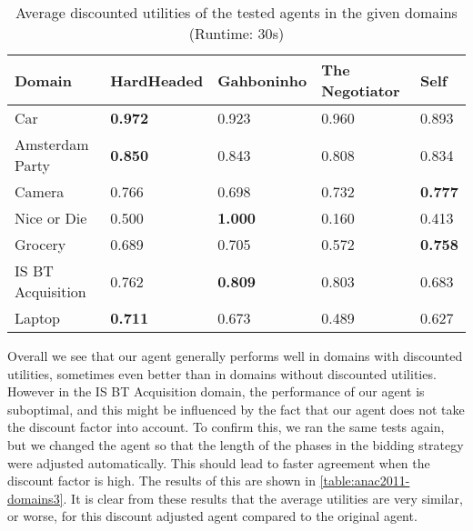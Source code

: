 \begin{table}[H]
  \centering
  \small
  \begin{tabular}{lp{2.5cm}p{2.5cm}p{2.5cm}p{2.5cm}}
  \toprule
  Domain                    & HardHeaded     & Gahboninho     & The Negotiator & Self \\ 
  \midrule
  Car                       & \textbf{0.972} & 0.923          & 0.960          & 0.893 \\
  Amsterdam Party           & \textbf{0.850} & 0.843          & 0.808          & 0.834 \\ 
  Camera                    & 0.766          & 0.698          & 0.732          & \textbf{0.777} \\ 
  Nice or Die               & 0.500          & \textbf{1.000} & 0.160          & 0.413 \\ 
  Grocery                   & 0.689          & 0.705          & 0.572          & \textbf{0.758} \\ 
  IS BT Acquisition         & 0.762          & \textbf{0.809} & 0.803          & 0.683 \\ 
  Laptop                    & \textbf{0.711} & 0.673          & 0.489          & 0.627 \\ 
  \bottomrule
  \end{tabular}
  \caption{Average discounted utilities of the tested agents in the given domains (Runtime: $30$s) \label{table:anac2011-domains2}}
\end{table}

Overall we see that our agent generally performs well in domains with discounted utilities, sometimes even better than in domains without discounted utilities. However in the IS BT Acquisition domain, the performance of our agent is suboptimal, and this might be influenced by the fact that our agent does not take the discount factor into account. To confirm this, we ran the same tests again, but we changed the agent so that the length of the phases in the bidding strategy were adjusted automatically. This should lead to faster agreement when the discount factor is high. The results of this are shown in \autoref{table:anac2011-domains3}. It is clear from these results that the average utilities are very similar, or worse, for this discount adjusted agent compared to the original agent.

